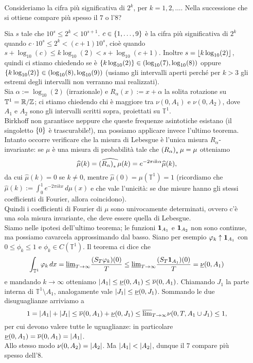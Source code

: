 \begin{esercizio}Consideriamo la cifra più significativa di $2^k$, per $k=1,2,\dots$.
Nella successione che si ottiene compare più spesso il $7$ o l'$8$?
\end{esercizio}

\begin{soluz}Sia $s$ tale che $10^s\le 2^k<10^{s+1}$. $c\in\left\{1,\dots,9\right\}$ è la cifra più significativa di $2^k$
quando $c\cdot 10^s\le 2^k<(c+1)10^s$, cioè quando $s+\log_{10}(c)\le k\log_{10}(2)<s+\log_{10}(c+1)$.
Inoltre $s=\left\lfloor k\log_{10}(2)\right\rfloor$, quindi ci stiamo chiedendo se è
$\left\{k\log_{10}(2)\right\}\in\left(\log_{10}(7),\log_{10}(8)\right)$ oppure $\left\{k\log_{10}(2)\right\}\in\left(\log_{10}(8),\log_{10}(9)\right)$
(usiamo gli intervalli aperti perché per $k>3$ gli estremi degli intervalli non verranno mai realizzati). \\
Sia $\alpha:=\log_{10}(2)$ (irrazionale) e $R_\alpha(x):=x+\alpha$ la solita rotazione
su $\mathbb{T}^1=\mathbb{R}/\mathbb{Z}$; ci stiamo chiedendo chi è maggiore tra $\nu(0,A_1)$ e $\nu(0,A_2)$, dove $A_1$
e $A_2$ sono gli intervalli scritti sopra, proiettati su $\mathbb{T}^1$. \\
Birkhoff non garantisce neppure che queste frequenze asintotiche esistano (il singoletto $\left\{0\right\}$ è trascurabile!),
ma possiamo applicare invece l'ultimo teorema. \\
Intanto occorre verificare che la misura di Lebesgue è l'unica misura $R_\alpha$-invariante:
se $\mu$ è una misura di probabilità tale che $\left(R_\alpha\right)_*\mu=\mu$ otteniamo
\[ \widehat{\mu}(k)=\widehat{\left(R_\alpha\right)_*\mu}(k)=e^{-2\pi i k\alpha}\widehat{\mu}(k), \]
da cui $\widehat{\mu}(k)=0$ se $k\neq 0$, mentre $\widehat{\mu}(0)=\mu(\mathbb{T}^1)=1$
(ricordiamo che $\widehat{\mu}(k):=\int_0^1 e^{-2\pi i kx}\,d\mu(x)$
e che vale l'unicità: se due misure hanno gli stessi coefficienti di Fourier, allora coincidono). \\
Quindi i coefficienti di Fourier di $\mu$ sono univocamente determinati, ovvero c'è una sola misura invariante,
che deve essere quella di Lebesgue. \\
Siamo nelle ipotesi dell'ultimo teorema; le funzioni $\bm{1}_{A_1}$ e $\bm{1}_{A_2}$ non sono continue, ma possiamo cavarcela
approssimando dal basso. Siano per esempio $\varphi_k\uparrow \bm{1}_{A_1}$ con $0\le\phi_k\le 1$ e $\phi_k\in C(\mathbb{T}^1)$.
Il teorema ci dice che
\[ \int_{\mathbb{T}^1} \varphi_k\,dx=\underline{\lim}_{T\to\infty}\frac{(S_T\varphi_k)(0)}{T}
\le\underline{\lim}_{T\to\infty}\frac{(S_T\bm{1}_{A_1})(0)}{T}=\underline{\nu}(0,A_1) \]
e mandando $k\to\infty$ otteniamo $\left|A_1\right|\le\underline{\nu}(0,A_1)\le\overline{\nu}(0,A_1)$.
Chiamando $J_1$ la parte interna di $\mathbb{T}^1\setminus A_1$,
analogamente vale $\left|J_1\right|\le\underline{\nu}(0,J_1)$. Sommando le due disuguaglianze arriviamo a
\[ 1=\left|A_1\right|+\left|J_1\right|\le\overline{\nu}(0,A_1)+\underline{\nu}(0,J_1)\le \overline{\lim}_{T\to\infty}\nu(0,T,A_1\cup J_1)\le 1, \]
per cui devono valere tutte le uguaglianze: in particolare $\underline{\nu}(0,A_1)=\overline{\nu}(0,A_1)=\left|A_1\right|$. \\
Allo stesso modo $\nu(0,A_2)=\left|A_2\right|$. Ma $\left|A_1\right|<\left|A_2\right|$, dunque il $7$ compare più spesso dell'$8$.
\end{soluz}

